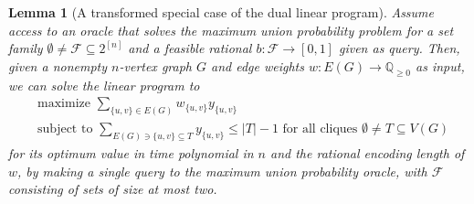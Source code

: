 \documentclass[10pt,a4paper]{amsart}
\newtheorem{lemma}{Lemma}
\begin{document}
\begin{lemma}[A transformed special case of the dual linear program]
\label{lem:special-dual}
Assume access to an oracle that solves the maximum union
probability problem for a set family $\emptyset\neq\mathcal{F}\subseteq2^{[n]}$ 
and a feasible rational $b:\mathcal{F}\rightarrow [0,1]$ given as query.
Then, given a nonempty $n$-vertex graph $G$ and edge weights
$w:E(G)\rightarrow\mathbb{Q}_{\geq 0}$
as input, we can solve the linear program to
\begin{equation}
\label{eq:dual-simplified}
\begin{split}
&\text{maximize $\sum_{\{u,v\}\in E(G)}w_{\{u,v\}}y_{\{u,v\}}$}\\
&\text{subject to $\sum_{E(G)\ni \{u,v\}\subseteq T}y_{\{u,v\}}\leq |T|-1$ 
for all cliques $\emptyset\neq T\subseteq V(G)$}
\end{split}
\end{equation}
for its optimum value in time polynomial in $n$ and the rational encoding 
length of $w$, by making a single query to the maximum union probability 
oracle, with $\mathcal{F}$ consisting of sets of size at most two.
\end{lemma}
\end{document}
